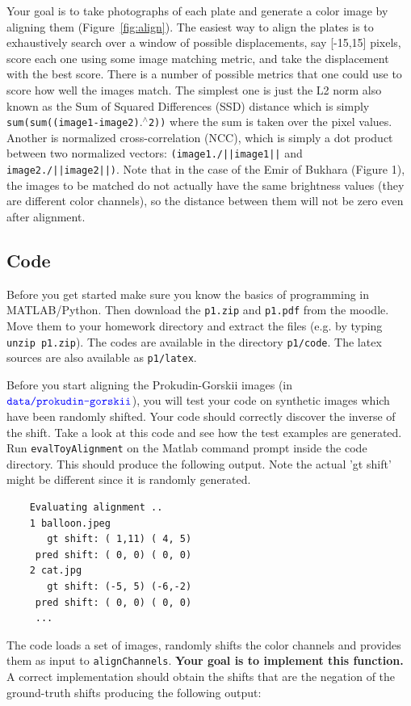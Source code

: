 \documentclass[10pt,letterpaper]{article}
\newcommand{\cmd}[1] {{\color{blue}\texttt{#1}}}
\begin{document}
Your goal is to take photographs of each plate and generate a color image by aligning them (Figure~\ref{fig:align}). The easiest way to align the plates is to exhaustively search over a window of possible displacements, say [-15,15] pixels, score each one using some image matching metric, and take the displacement with the best score. There is a number of possible metrics that one could use to score how well the images match. The simplest one is just the L2 norm also known as the Sum of Squared Differences (SSD) distance which is simply \cmd{sum(sum((image1-image2)$.^\wedge$2))} where the sum is taken over the pixel values. Another is normalized cross-correlation (NCC), which is simply a dot product between two normalized vectors: \cmd{(image1./||image1||} and \cmd{image2./||image2||)}. Note that in the case of the Emir of Bukhara (Figure 1), the images to be matched do not actually have the same brightness values (they are different color channels), so the distance between them will not be zero even after alignment.

\subsection{Code}
Before you get started make sure you know the basics of programming in MATLAB/Python. Then download the \cmd{p1.zip} and \cmd{p1.pdf} from the moodle. Move them to your homework directory and extract the files (e.g. by typing \cmd{unzip p1.zip}). The codes are available in the directory \cmd{p1/code}.
The latex sources are also available as \cmd{p1/latex}.  

Before you start aligning the Prokudin-Gorskii images (in $\cmd{data/prokudin-gorskii}$), you will test your code on synthetic images which have been randomly shifted. Your code should correctly discover the inverse of the shift. Take a look at this code and see how the test examples are generated. Run \cmd{evalToyAlignment} on the Matlab command prompt inside the code directory. This should produce the following output. Note the actual 'gt shift' might be different since it is randomly generated.
\begin{verbatim}
    Evaluating alignment ..
    1 balloon.jpeg
	   gt shift: ( 1,11) ( 4, 5)
	 pred shift: ( 0, 0) ( 0, 0)
    2 cat.jpg
	   gt shift: (-5, 5) (-6,-2)
	 pred shift: ( 0, 0) ( 0, 0)
     ...
\end{verbatim}
    
The code loads a set of images, randomly shifts the color channels and provides them as input to \cmd{alignChannels}. 
\textbf{Your goal is to implement this function.}
A correct implementation should obtain the shifts that are the negation of the ground-truth shifts producing the following output:
\end{document}
